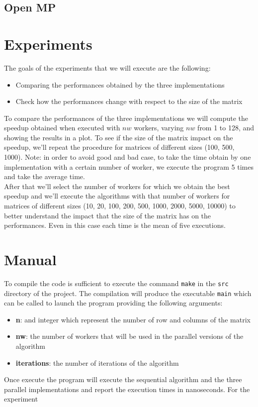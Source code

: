 \documentclass[12pt]{article}
\begin{document}
	\subsection{Open MP}
	
	
	
	\section{Experiments}
	The goals of the experiments that we will execute are the following: 
	\begin{itemize}
		\item Comparing the performances obtained by the three implementations 
		\item Check how the performances change with respect to the size of the matrix
	\end{itemize}
	To compare the performances of the three implementations we will compute the speedup obtained when executed with $nw$ workers, varying $nw$ from 1 to 128, and showing the results in a plot. To see if the size of the matrix impact on the speedup, we'll repeat the procedure for matrices of different sizes (100, 500, 1000). Note: in order to avoid good and bad case, to take the time obtain by one implementation with a certain number of worker, we execute the program 5 times and take the average time. \\
	After that we'll select the number of workers for which we obtain the best speedup and we'll execute the algorithms with that number of workers for matrices of different sizes (10, 20, 100, 200, 500, 1000, 2000, 5000, 10000) to better understand the impact that the size of the matrix has on the performances. Even in this case each time is the mean of five executions. 
	\section{Manual}
	To compile the code is sufficient to execute the command \verb*|make| in the \verb*|src| directory of the project. The compilation will produce the executable \verb*|main| which can be called to launch the program providing the following arguments:
	\begin{itemize}
		\item \textbf{n}: and integer which represent the number of row and columns of the matrix
		\item \textbf{nw}: the number of workers that will be used in the parallel versions of the algorithm
		\item \textbf{iterations}: the number of iterations of the algorithm
	\end{itemize} 
	Once execute the program will execute the sequential algorithm and the three parallel implementations and report the execution times in nanoseconds. For the experiment
\end{document}
